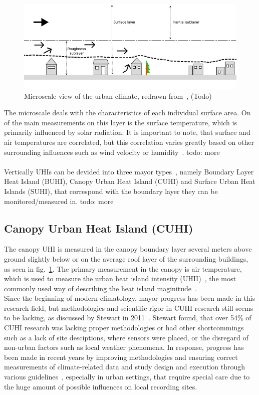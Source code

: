 \begin{figure}[h]
    \centering
    \includegraphics[width=\textwidth]{images/Localscale Boundary Layer.png}
    \caption{Microscale view of the urban climate, redrawn from~\cite{oke2006guideline}, (Todo)}
    \label{fig:microscale boundary layer}
\end{figure}

The microscale deals with the characteristics of each individual surface area. On of the main measurements on this layer is the surface temperature, which is primarily influenced by solar radiation. It is important to note, that surface and air temperatures are correlated, but this correlation varies greatly based on other surrounding influences such as wind velocity or humidity~\cite{stoll1992surface}.
todo: more\\
\\
Vertically UHIs can be devided into three mayor types~\cite{oke1976distinction, oke2017urban}, namely Boundary Layer Heat Island (BUHI), Canopy Urban Heat Island (CUHI) and Surface Urban Heat Islands (SUHI), that correspond with the boundary layer they can be monitored/measured in.
todo: more

\subsection{Canopy Urban Heat Island (CUHI)}

The canopy UHI is measured in the canopy boundary layer several meters above ground slightly below or on the average roof layer of the surrounding buildings, as seen in fig.~\ref{fig:microscale boundary layer}. The primary measurement in the canopy is air temperature, which is used to measure the urban heat island intensity (UHII)~\cite{oke1973city}, the most commonly used way of describing the heat island maginitude~\cite{kim2021urban}.\\
Since the beginning of modern climatology, mayor progress has been made in this research field, but methodologies and scientific rigor in CUHI research still seems to be lacking, as discussed by Stewart in 2011~\cite{stewart2011systematic}. Stewart found, that over 54\% of CUHI research was lacking proper methodologies or had other shortcommings such as a lack of site desciptions, where sensors were placed, or the disregard of non-urban factors such as local weather phenomena. In response, progress has been made in recent years by improving methodologies and ensuring correct measurements of climate-related data and study design and execution through various guidelines~\cite{oke2006guideline}, especially in urban settings, that require special care due to the huge amount of possible influences on local recording sites.\\

